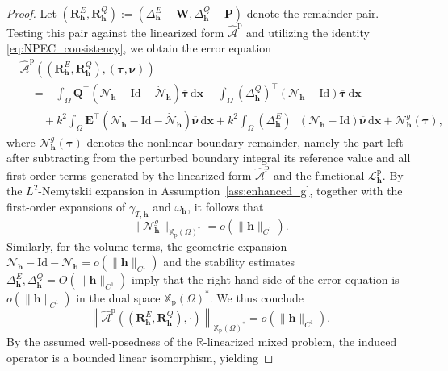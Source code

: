 \documentclass[10pt,a4paper]{amsart}
\numberwithin{equation}{section}
\begin{document}
\begin{proof}
Let $(\mathbf{R}_{\mathbf{h}}^E, \mathbf{R}_{\mathbf{h}}^Q) := (\Delta_{\mathbf{h}}^E - \mathbf{W}, \Delta_{\mathbf{h}}^Q - \mathbf{P})$ denote the remainder pair. Testing this pair against the linearized form $\widehat{\mathcal{A}}^{\mathrm{p}}$ and utilizing the identity \eqref{eq:NPEC_consistency}, we obtain the error equation
\[
\begin{aligned}
&\widehat{\mathcal{A}}^{\mathrm{p}}((\mathbf{R}_{\mathbf{h}}^E, \mathbf{R}_{\mathbf{h}}^Q), (\boldsymbol{\tau}, \boldsymbol{\nu})) \\
&\quad = -\int_\Omega \mathbf{Q}^\top (\mathcal{N}_{\mathbf{h}} - \mathrm{Id} - \dot{\mathcal{N}}_{\mathbf{h}}) \overline{\boldsymbol{\tau}} \,\mathrm{d}\boldsymbol{x} - \int_\Omega (\Delta_{\mathbf{h}}^Q)^\top (\mathcal{N}_{\mathbf{h}} - \mathrm{Id}) \overline{\boldsymbol{\tau}} \,\mathrm{d}\boldsymbol{x} \\
&\quad \quad + k^2 \int_\Omega \mathbf{E}^\top (\mathcal{N}_{\mathbf{h}} - \mathrm{Id} - \dot{\mathcal{N}}_{\mathbf{h}}) \overline{\boldsymbol{\nu}} \,\mathrm{d}\boldsymbol{x} + k^2 \int_\Omega (\Delta_{\mathbf{h}}^E)^\top (\mathcal{N}_{\mathbf{h}} - \mathrm{Id}) \overline{\boldsymbol{\nu}} \,\mathrm{d}\boldsymbol{x} + \mathcal{N}_{\mathbf{h}}^g(\boldsymbol{\tau}),
\end{aligned}
\]
where \(\mathcal N_{\mathbf h}^{g}(\boldsymbol{\tau})\) denotes the nonlinear
boundary remainder, namely the part left after subtracting from the perturbed
boundary integral its reference value and all first-order terms generated by
the linearized form \(\widehat{\mathcal A}^{\mathrm p}\) and the functional
\(\mathcal L_{\mathbf h}^{\mathrm p}\). By the \(L^2\)-Nemytskii expansion in
Assumption~\eqref{ass:enhanced_g}, together with the first-order expansions of
\(\gamma_{T,\mathbf h}\) and \(\omega_{\mathbf h}\), it follows that
\[
\|\mathcal N_{\mathbf h}^{g}\|_{\mathbb X_{\mathrm p}(\Omega)^*}
=
o(\|\mathbf h\|_{C^1}).
\]
Similarly, for the volume terms, the geometric expansion $\mathcal{N}_{\mathbf{h}} - \mathrm{Id} - \dot{\mathcal{N}}_{\mathbf{h}} = o(\|\mathbf{h}\|_{C^1})$ and the stability estimates $\Delta_{\mathbf{h}}^E, \Delta_{\mathbf{h}}^Q = O(\|\mathbf{h}\|_{C^1})$ imply that the right-hand side of the error equation is $o(\|\mathbf{h}\|_{C^1})$ in the dual space $\mathbb{X}_{\mathrm{p}}(\Omega)^*$. We thus conclude
\[
\left\| \widehat{\mathcal{A}}^{\mathrm{p}}((\mathbf{R}_{\mathbf{h}}^E, \mathbf{R}_{\mathbf{h}}^Q), \cdot) \right\|_{\mathbb{X}_{\mathrm{p}}(\Omega)^*} = o(\|\mathbf{h}\|_{C^1}).
\]
By the assumed well-posedness of the $\mathbb{R}$-linearized mixed problem, the induced operator is a bounded linear isomorphism, yielding

\end{proof}
\end{document}
